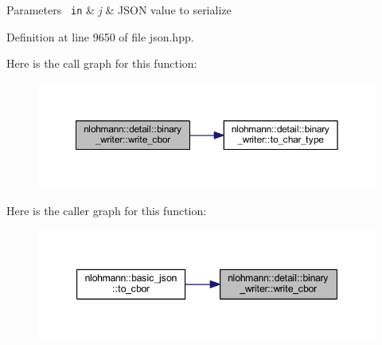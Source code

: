 \begin{DoxyParams}[1]{Parameters}
\mbox{\texttt{ in}}  & {\em j} & J\+S\+ON value to serialize \\
\hline
\end{DoxyParams}


Definition at line 9650 of file json.\+hpp.

Here is the call graph for this function\+:
\nopagebreak
\begin{figure}[H]
\begin{center}
\leavevmode
\includegraphics[width=350pt]{classnlohmann_1_1detail_1_1binary__writer_aa0ab8d27fd88a33a2f801413ac4c7fbc_cgraph}
\end{center}
\end{figure}
Here is the caller graph for this function\+:
\nopagebreak
\begin{figure}[H]
\begin{center}
\leavevmode
\includegraphics[width=347pt]{classnlohmann_1_1detail_1_1binary__writer_aa0ab8d27fd88a33a2f801413ac4c7fbc_icgraph}
\end{center}
\end{figure}
\mbox{\label{classnlohmann_1_1detail_1_1binary__writer_ae4e0852b64102ce4b07d99f08f828b7c}} 
